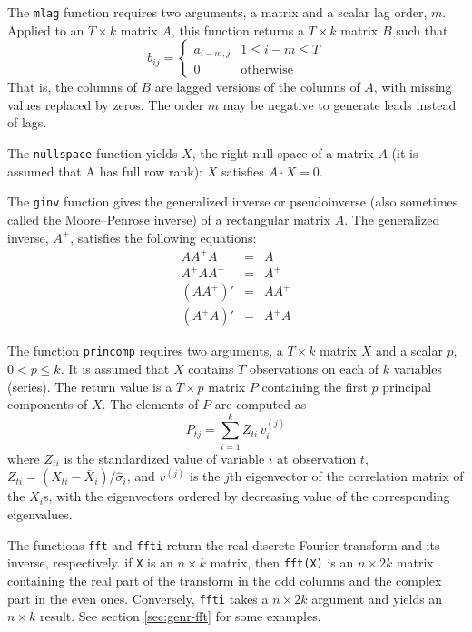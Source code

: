 The \texttt{mlag} function requires two arguments, a matrix and a
scalar lag order, $m$.  Applied to an $T \times k$ matrix $A$, this
function returns a $T \times k$ matrix $B$ such that
%
\[
  b_{ij} = \left\{ 
    \begin{array}{ll} 
      a_{i-m,j} & 1 \leq i - m \leq T \\ 
      0 & \mbox{otherwise}
    \end{array}
    \right.
\]
%
That is, the columns of $B$ are lagged versions of the columns of $A$,
with missing values replaced by zeros.  The order $m$ may be negative
to generate leads instead of lags.

The \texttt{nullspace} function yields $X$, the right null space of a
matrix $A$ (it is assumed that A has full row rank): $X$ satisfies $A
\cdot X = 0$.

The \texttt{ginv} function gives the generalized inverse or
pseudoinverse (also sometimes called the Moore--Penrose inverse) of a
rectangular matrix $A$.  The generalized inverse, $A^+$, satisfies the
following equations:
\begin{eqnarray*}
AA^+A &=& A \\
A^+AA^+	&=& A^+	 \\
(AA^+)' &=& AA^+ \\	
(A^+A)' &=& A^+A
\end{eqnarray*}

The function \texttt{princomp} requires two arguments, a $T \times k$
matrix $X$ and a scalar $p$, $0 < p \leq k$.  It is assumed that $X$
contains $T$ observations on each of $k$ variables (series).  The
return value is a $T \times p$ matrix $P$ containing the first $p$
principal components of $X$.  The elements of $P$ are computed as
\[
P_{tj} = \sum_{i=1}^{k} Z_{ti} \, v^{(j)}_i
\]
where $Z_{ti}$ is the standardized value of variable $i$ at
observation $t$, $Z_{ti} = (X_{ti} - \bar{X}_i) / \hat{\sigma}_i$, and
$v^{(j)}$ is the $j$th eigenvector of the correlation matrix of the
$X_i$s, with the eigenvectors ordered by decreasing value of the
corresponding eigenvalues.

The functions \texttt{fft} and \texttt{ffti} return the real discrete
Fourier transform and its inverse, respectively. if \texttt{X} is an $n
\times k$ matrix, then \texttt{fft(X)} is an $n \times 2k$ matrix
containing the real part of the transform in the odd columns and the
complex part in the even ones. Conversely, \texttt{ffti} takes a $n
\times 2k$ argument and yields an $n \times k$ result. See section
\ref{sec:genr-fft} for some examples.

